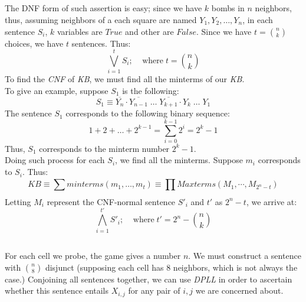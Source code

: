 \documentclass{article}
\begin{document}
    \subsection{}
    The DNF form of such assertion is easy; since we have $k$ bombs in $n$ neighbors, thus, assuming neighbors of a each square are named $Y_1, Y_2, \dots, Y_n$, in each sentence $S_i$, $k$ variables are $True$ and other are $False$. Since we have $ t= \binom{n}{k} $ choices, we have $t$ sentences. Thus:
    $$ 
        \bigvee\limits_{i=1}^t S_i; \; \; \; \; \text{where} \; t = \binom{n}{k}
    $$
    To find the \textit{CNF} of \textit{KB}, we must find all the minterms of our \textit{KB}.\\
    To give an example, suppose $ S_{1} $ is the following:
    $$
        S_1 \equiv \overline{Y_n} \cdot \overline{Y_{n-1}} \; \dots \; \overline{Y_{k+1}} \cdot Y_{k} \; \dots \; Y_1
    $$
    The sentence $S_1$ corresponds to the following binary sequence:
    $$
        1 + 2 + \dots + 2^{k-1} = \sum_{i=0}^{k-1} 2^i = 2^{k} - 1
    $$
    Thus, $S_1$ corresponds to the minterm number $2^k - 1$. \\
    Doing such process for each $ S_i $, we find all the minterms. Suppose $m_i$ corresponds to $S_i$. Thus:
    $$
        KB \equiv \sum_{}^{} minterms(m_1, \dots, m_t) \equiv \prod_{}^{} Maxterms(M_1, \cdots, M_{2^n - t})
    $$
    Letting $M_i$ represent the CNF-normal sentence $S'_{i}$ and $t'$ as $2^n - t$, we arrive at:
    $$
        \bigwedge\limits_{i=1}^{t'} S'_i; \; \; \; \; \text{where} \; t' = 2^n - \binom{n}{k}
    $$
    \subsection{}
    For each cell we probe, the game gives a number $n$. We must construct a sentence with $\binom{n}{8}$ disjunct (supposing each cell has 8 neighbors, which is not always the case.) Conjoining all sentences together, we can use \textit{DPLL} in order to ascertain whether this sentence entails $X_{i,j}$ for any pair of $i, j$ we are concerned about.
\end{document}
